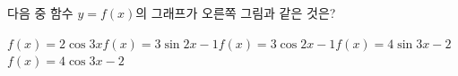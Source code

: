 \noindent\begin{minipage}[t]{0.58\linewidth}\vspace{0pt}\raggedright 다음 중 함수 $y=f(x)$의 그래프가 오른쪽 그림과 같은 것은?\end{minipage}\hfill\begin{minipage}[t]{0.4\linewidth}\vspace{0pt}\centering \resizebox{\ifdim\width>\linewidth\linewidth\else\width\fi}{!}{}\end{minipage}\par
\begin{choicesv}{$f(x)=2\cos 3x$}{$f(x)=3\sin 2x-1$}{$f(x)=3\cos 2x-1$}{$f(x)=4\sin 3x-2$}{$f(x)=4\cos 3x-2$}\end{choicesv}
